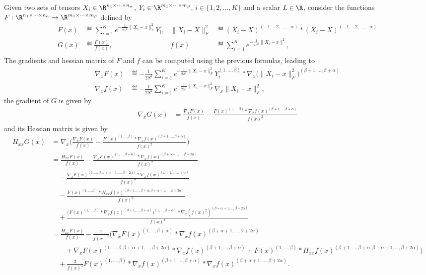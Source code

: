 \documentclass[11pt]{article}
\theoremstyle{remark}
\begin{document}
Given two sets of tensors $X_i\in\R^{n_1\times\cdots\times n_\alpha}$, $Y_i\in\R^{m_1\times\cdots\times m_\beta}$, $i\in\{1,2,\dots,K\}$ and a
scalar $L\in\R$, consider the functions $F:\R^{n_1\times\cdots\times n_\alpha}\to\R^{m_1\times\cdots\times m_\beta}$
defined by
\begin{align*}
  F(x)&\eqdef \sum_{i=1}^K e^{-\frac{1}{2S^2}\|X_i-x\|_F^2} Y_i , &
  \|X_i-X\|_F^2&\eqdef (X_i-X)^{(-1,-2,\dots,-\alpha)} * (X_i-X)^{(-1,-2,\dots,-\alpha)}\\
  G(x)&\eqdef \frac{F(x)}{f(x)}, &
  f(x)&\eqdef \sum_{i=1}^K e^{-\frac{1}{2S^2}\|X_i-x\|^2}, \\
\end{align*}
The gradients and hessian matrix of $F$ and $f$ can be computed using the previous
formulas, leading to
\begin{align*}
  \nabla_x F(x)&\eqdef-\frac{1}{2S^2}\sum_{i=1}^K e^{-\frac{1}{2S^2}\|X_i-x\|_F^2}
            Y_i^{(1,\dots,\beta)} * \nabla_x \big(  \|X_i-x\|_F^2 \big)^{(\beta+1,\dots,\beta+\alpha)}\\
  \nabla_x f(x)&\eqdef-\frac{1}{2S^2}\sum_{i=1}^K e^{-\frac{1}{2S^2}\|X_i-x\|_F^2} \nabla_x
            \|X_i-x\|_F^2,
\end{align*}
the gradient of $G$ is given by
\begin{align*}
  \nabla_x G(x)&=\frac{\nabla_x F(x)}{f(x)}-\frac{F(x)^{(1,\dots,\beta)}*\nabla_x f(x)^{(\beta+1,\dots,\beta+\alpha)}}{f(x)^2}
\end{align*}
and its Hessian matrix is given by
\begin{align*}
  H_{xx}G(x)&=\nabla_x\Big(\frac{\nabla_x F(x)}{f(x)}
              -\frac{F(x)^{(1,\dots,\beta)}*\nabla_x f(x)^{(\beta+1,\dots,\beta+\alpha)}}{f(x)^2}\big)\\
            &=\frac{H_{xx}F(x)}{f(x)}
              -\frac{\nabla_xF(x)^{(1,\dots,\beta+\alpha)}*\nabla_x f(x)^{(\beta+\alpha+1,\dots,\beta+2\alpha)}}{f(x)^2}\\&\quad
              -\frac{\nabla_x F(x)^{(1,\dots,\beta,\beta+\alpha+1,\dots,\beta+2\alpha)}*\nabla_x f(x)^{(\beta+1,\dots,\beta+\alpha)}}{f(x)^2}\\&\quad
              -\frac{F(x)^{(1,\dots,\beta)}*H_{xx} f(x)^{(\beta+1,\dots,\beta+\alpha,\beta+\alpha+1,\dots,\beta+2\alpha)}}{f(x)^2}\\&\quad
              +\frac{\big(F(x)^{(1,\dots,\beta)}*\nabla_x f(x)^{(\beta+1,\dots,\beta+\alpha)}\big)^{(1,\dots,\beta+\alpha)}*\nabla_x(f(x)^2)^{(\beta+\alpha+1,\dots,\beta+2\alpha)}}{f(x)^4}\\
            &=\frac{H_{xx}F(x)}{f(x)}
              -\frac{1}{f(x)^2}\bigg(\nabla_xF(x)^{(1,\dots,\beta+\alpha)}*\nabla_xf(x)^{(\beta+\alpha+1,\dots,\beta+2\alpha)}\\&\qquad
              +\nabla_x F(x)^{(1,\dots,\beta,\beta+\alpha+1,\dots,\beta+2\alpha)}*\nabla_x f(x)^{(\beta+1,\dots,\beta+\alpha)}
              +F(x)^{(1,\dots,\beta)}*H_{xx} f(x)^{(\beta+1,\dots,\beta+\alpha,\beta+\alpha+1,\dots,\beta+2\alpha)}\bigg)\\&\quad
              +\frac{2}{f(x)^3}F(x)^{(1,\dots,\beta)}*\nabla_x f(x)^{(\beta+1,\dots,\beta+\alpha)}*\nabla_x f(x)^{(\beta+\alpha+1,\dots,\beta+2\alpha)}.
\end{align*}
\end{document}
